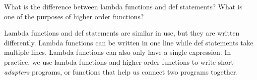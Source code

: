 \begin{blocksection}
\question What is the difference between lambda functions and def statements? What is one of the purposes of higher order functions?

\begin{solution}[0.5in]
Lambda functions and def statements are similar in use,  but they are written differently. Lambda functions can be written in one line while def statements take multiple lines. Lambda functions can also only have a single expression. In practice, we use lambda functions and higher-order functions to write short \emph{adapters} programs, or functions that help us connect two programs together. 
\end{solution}
\end{blocksection}
